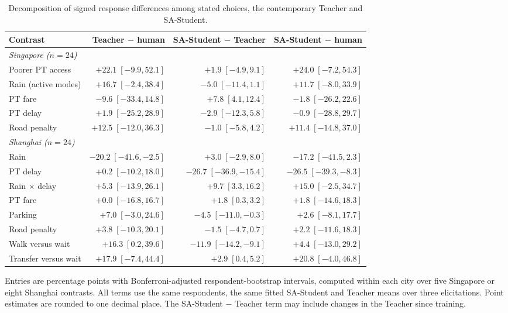 \begin{table}[pos=htbp]
\centering\small
\caption{Decomposition of signed response differences among stated choices, the contemporary Teacher and SA-Student.}
\label{tab:teacher_decomposition_s9}
\setlength{\tabcolsep}{3pt}
\renewcommand{\arraystretch}{1.12}
\begin{tabular*}{\linewidth}{@{\extracolsep{\fill}}lrrr@{}}
\toprule
Contrast & Teacher $-$ human & SA-Student $-$ Teacher & SA-Student $-$ human \\
\midrule
\multicolumn{4}{l}{\textit{Singapore ($n=24$)}} \\
Poorer PT access & $+22.1\;[-9.9, 52.1]$ & $+1.9\;[-4.9, 9.1]$ & $+24.0\;[-7.2, 54.3]$ \\
Rain (active modes) & $+16.7\;[-2.4, 38.4]$ & $-5.0\;[-11.4, 1.1]$ & $+11.7\;[-8.0, 33.9]$ \\
PT fare & $-9.6\;[-33.4, 14.8]$ & $+7.8\;[4.1, 12.4]$ & $-1.8\;[-26.2, 22.6]$ \\
PT delay & $+1.9\;[-25.2, 28.9]$ & $-2.9\;[-12.3, 5.8]$ & $-0.9\;[-28.8, 29.7]$ \\
Road penalty & $+12.5\;[-12.0, 36.3]$ & $-1.0\;[-5.8, 4.2]$ & $+11.4\;[-14.8, 37.0]$ \\
\midrule
\multicolumn{4}{l}{\textit{Shanghai ($n=24$)}} \\
Rain & $-20.2\;[-41.6, -2.5]$ & $+3.0\;[-2.9, 8.0]$ & $-17.2\;[-41.5, 2.3]$ \\
PT delay & $+0.2\;[-10.2, 18.0]$ & $-26.7\;[-36.9, -15.4]$ & $-26.5\;[-39.3, -8.3]$ \\
Rain $\times$ delay & $+5.3\;[-13.9, 26.1]$ & $+9.7\;[3.3, 16.2]$ & $+15.0\;[-2.5, 34.7]$ \\
PT fare & $+0.0\;[-16.8, 16.7]$ & $+1.8\;[0.3, 3.2]$ & $+1.8\;[-14.6, 18.3]$ \\
Parking & $+7.0\;[-3.0, 24.6]$ & $-4.5\;[-11.0, -0.3]$ & $+2.6\;[-8.1, 17.7]$ \\
Road penalty & $+3.8\;[-10.3, 20.1]$ & $-1.5\;[-4.7, 0.7]$ & $+2.2\;[-11.6, 18.3]$ \\
Walk versus wait & $+16.3\;[0.2, 39.6]$ & $-11.9\;[-14.2, -9.1]$ & $+4.4\;[-13.0, 29.2]$ \\
Transfer versus wait & $+17.9\;[-7.4, 44.4]$ & $+2.9\;[0.4, 5.2]$ & $+20.8\;[-4.0, 46.8]$ \\
\bottomrule
\end{tabular*}
\par\smallskip\begin{minipage}{\linewidth}\footnotesize
Entries are percentage points with Bonferroni-adjusted respondent-bootstrap intervals, computed within each city over five Singapore or eight Shanghai contrasts. All terms use the same respondents, the same fitted SA-Student and Teacher means over three elicitations. Point estimates are rounded to one decimal place. The SA-Student $-$ Teacher term may include changes in the Teacher since training.
\end{minipage}
\end{table}
